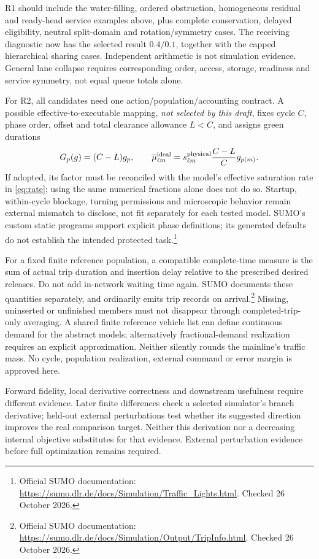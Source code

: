 \documentclass[11pt]{article}
\begin{document}
R1 should include the water-filling, ordered obstruction, homogeneous residual and ready-head service examples above, plus complete conservation, delayed eligibility, neutral split-domain and rotation/symmetry cases. The receiving diagnostic now has the selected result $0.4/0.1$, together with the capped hierarchical sharing cases. Independent arithmetic is not simulation evidence. General lane collapse requires corresponding order, access, storage, readiness and service symmetry, not equal queue totals alone.

For R2, all candidates need one action/population/accounting contract. A possible effective-to-executable mapping, \emph{not selected by this draft}, fixes cycle $C$, phase order, offset and total clearance allowance $L<C$, and assigns green durations
\begin{equation}
 G_p(g)=(C-L)g_p,\qquad
 \overline\mu^{\rm ideal}_{\ell m}
 =s^{\rm physical}_{\ell m}\frac{C-L}{C}g_{p(m)}.
 \label{eq:external-action}
\end{equation}
If adopted, its factor must be reconciled with the model's effective saturation rate in \eqref{eq:rate}; using the same numerical fractions alone does not do so. Startup, within-cycle blockage, turning permissions and microscopic behavior remain external mismatch to disclose, not fit separately for each tested model. SUMO's custom static programs support explicit phase definitions; its generated defaults do not establish the intended protected task.\footnote{Official SUMO documentation: \url{https://sumo.dlr.de/docs/Simulation/Traffic_Lights.html}. Checked 26 October 2026.}

For a fixed finite reference population, a compatible complete-time measure is the sum of actual trip duration and insertion delay relative to the prescribed desired releases. Do not add in-network waiting time again. SUMO documents these quantities separately, and ordinarily emits trip records on arrival.\footnote{Official SUMO documentation: \url{https://sumo.dlr.de/docs/Simulation/Output/TripInfo.html}. Checked 26 October 2026.} Missing, uninserted or unfinished members must not disappear through completed-trip-only averaging. A shared finite reference vehicle list can define continuous demand for the abstract models; alternatively fractional-demand realization requires an explicit approximation. Neither silently rounds the mainline's traffic mass. No cycle, population realization, external command or error margin is approved here.

Forward fidelity, local derivative correctness and downstream usefulness require different evidence. Later finite differences check a selected simulator's branch derivative; held-out external perturbations test whether its suggested direction improves the real comparison target. Neither this derivation nor a decreasing internal objective substitutes for that evidence. External perturbation evidence before full optimization remains required.
\end{document}

